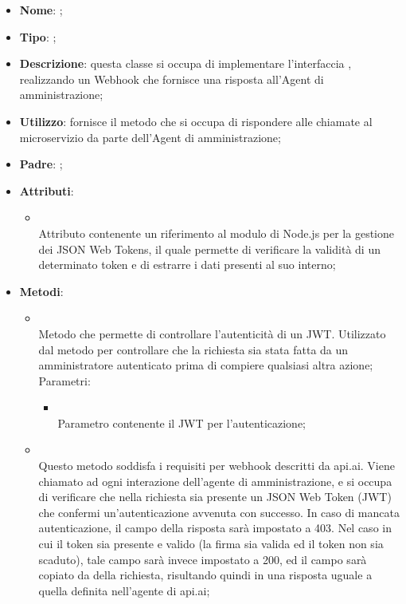\begin{itemize}
	\item \textbf{Nome}: ;
	\item \textbf{Tipo}: ;
	\item \textbf{Descrizione}: questa classe si occupa di implementare l'interfaccia , realizzando un Webhook che fornisce una risposta all'Agent di amministrazione;
	\item \textbf{Utilizzo}: fornisce il metodo che si occupa di rispondere alle chiamate al microservizio da parte dell'Agent di amministrazione;
	\item \textbf{Padre}: ;
	\item \textbf{Attributi}:
	\begin{itemize}
		\item[]  \\
		Attributo contenente un riferimento al modulo di Node.js per la gestione dei JSON Web Tokens, il quale permette di verificare la validità di un determinato token e di estrarre i dati presenti al suo interno;
	\end{itemize}
	\item \textbf{Metodi}:
	\begin{itemize}
		\item[]  \\
		Metodo che permette di controllare l'autenticità di un JWT. Utilizzato dal metodo  per controllare che la richiesta sia stata fatta da un amministratore autenticato prima di compiere qualsiasi altra azione;\\
		Parametri:
		\begin{itemize}
			\item {} \\
			Parametro contenente il JWT per l'autenticazione;
		\end{itemize}
		\item[]  \\
		Questo metodo soddisfa i requisiti per webhook descritti da api.ai. Viene chiamato ad ogni interazione dell'agente di amministrazione, e si occupa di verificare che nella richiesta sia presente un JSON Web Token (JWT) che confermi un'autenticazione avvenuta con successo. In caso di mancata autenticazione, il campo  della risposta sarà impostato a 403.  Nel caso in cui il token sia presente e valido (la firma sia valida ed il token non sia scaduto), tale campo sarà invece impostato a 200, ed il campo  sarà copiato da  della richiesta, risultando quindi in una risposta uguale a quella definita nell'agente di api.ai;\\

\end{itemize}
\end{itemize}

